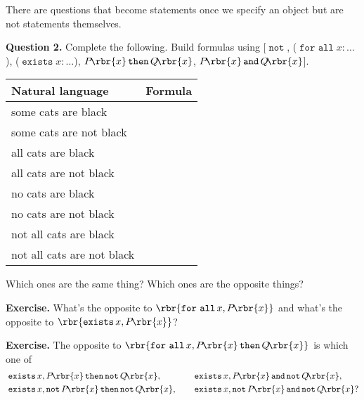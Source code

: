 \documentclass[12pt]{article}
\def\opthen{\mathop{\mathtt{then}}}
\def\opand{\mathop{\mathtt{and}}}
\def\opnot{\mathop{\mathtt{not}}}
\def\opforall{\mathop{\mathtt{for\ all}}}
\def\opexists{\mathop{\mathtt{exists}}}
\begin{document}
\leavevmode

There are questions that become statements once we specify an object but are not statements themselves.

\leavevmode

\hspace{-0.75in} \textbf{Question 2.} Complete the following. Build formulas using [$\opnot$, ($ \opforall x : \ldots $), ($ \opexists x : \ldots $), $ P\!\rbr{x} \opthen Q\! \rbr{x} $, $ P\!\rbr{x} \opand Q\!\rbr{x} $].
\begin{mdframed}
\begin{longtable}{l|l}
Natural language & Formula \\
\hline
some cats are black & \\
\hline
some cats are not black & \\
\hline
all cats are black & \\
\hline
all cats are not black & \\
\hline
no cats are black & \\
\hline
no cats are not black & \\
\hline
not all cats are black & \\
\hline
not all cats are not black & \phantom{not all cats are not black}
\end{longtable}
\end{mdframed}
Which ones are the same thing? Which ones are the opposite things?

\leavevmode

\hspace{-0.75in}\llap{> } \textbf{Exercise.} What's the opposite to $ \rbr{ \opforall x, P\!\rbr{x} } $ and what's the opposite to $ \rbr{ \opexists x, P\!\rbr{x} } $?

\hspace{-0.75in}\llap{> } \textbf{Exercise.} The opposite to $ \rbr{ \opforall x, P\!\rbr{x} \opthen Q\!\rbr{x} } $ is which one of
\begin{alignat*}{2}
& \opexists x, P\!\rbr{x} \opthen \opnot Q\!\rbr{x}, & \quad & \opexists x, P\!\rbr{x} \opand \opnot Q\!\rbr{x}, \\ & \opexists x, \opnot P\!\rbr{x} \opthen \opnot Q\!\rbr{x}, & \quad & \opexists x, \opnot P\!\rbr{x} \opand \opnot Q\!\rbr{x}?
\end{alignat*}

\leavevmode
\end{document}
